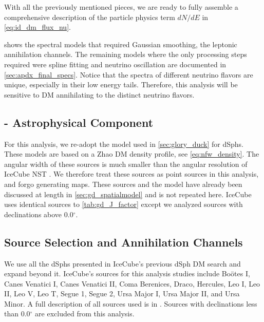 With all the previously mentioned pieces, we are ready to fully assemble a comprehensive description of the particle physics term $dN/dE$ in \cref{eq:id_dm_flux_nu}.
\nuIDDMFlux

 shows the spectral models that required Gaussian smoothing, the leptonic annihilation channels.
The remaining models where the only processing steps required were spline fitting and neutrino oscillation are documented in \cref{sec:apdx_final_specs}.
Notice that the spectra of different neutrino flavors are unique, especially in their low energy tails.
Therefore, this analysis will be sensitive to DM annihilating to the distinct neutrino flavors.

\subsection{\J - Astrophysical Component}\label{sec:icDM_spatialmodel}

For this analysis, we re-adopt the \GS model \cite{Geringer_Sameth_2015} used in \cref{sec:glory_duck} for dSphs.
These models are based on a Zhao DM density profile, see \cref{eq:nfw_density}.
The angular width of these sources is much smaller than the angular resolution of IceCube NST \cite{IC_NGC1068}.
We therefore treat these sources as point sources in this analysis, and forgo generating maps.
These sources and the \GS model have already been discussed at length in \cref{sec:gd_spatialmodel} and is not repeated here.
IceCube uses identical sources to \cref{tab:gd_J_factor} except we analyzed sources with declinations above 0.0$^\circ$.

\subsection{Source Selection and Annihilation Channels}\label{sec:ic3_study_selection}

We use all the dSphs presented in IceCube's previous dSph DM search \cite{IC3_DM2013} and expand beyond it.
IceCube's sources for this analysis studies include Boötes I, Canes Venatici I, Canes Venatici II, Coma Berenices, Draco, Hercules, Leo I, Leo II, Leo V, Leo T, Segue 1, Segue 2, Ursa Major I, Ursa Major II,  and Ursa Minor.
A full description of all sources used is in .
Sources with declinations less than 0.0$^\circ$ are excluded from this analysis.

